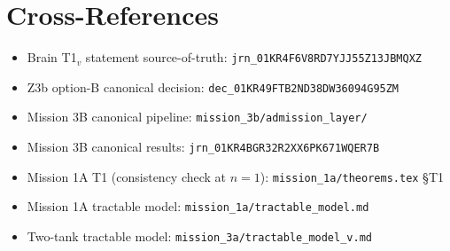 \documentclass[11pt]{article}
\begin{document}
\section{Cross-References}

\begin{itemize}
\item Brain T1${}_v$ statement source-of-truth: \texttt{jrn\_01KR4F6V8RD7YJJ55Z13JBMQXZ}
\item Z3b option-B canonical decision: \texttt{dec\_01KR49FTB2ND38DW36094G95ZM}
\item Mission 3B canonical pipeline: \texttt{mission\_3b/admission\_layer/}
\item Mission 3B canonical results: \texttt{jrn\_01KR4BGR32R2XX6PK671WQER7B}
\item Mission 1A T1 (consistency check at $n=1$): \texttt{mission\_1a/theorems.tex} \S T1
\item Mission 1A tractable model: \texttt{mission\_1a/tractable\_model.md}
\item Two-tank tractable model: \texttt{mission\_3a/tractable\_model\_v.md}
\end{itemize}
\end{document}
